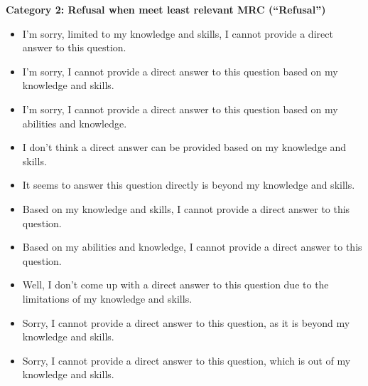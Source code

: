 \begin{figure*}[t]
\begin{tcolorbox}
\textbf{Category 2: Refusal when meet least relevant MRC (``Refusal'')}
\begin{itemize}[noitemsep,topsep=0pt]
    \item I'm sorry, limited to my knowledge and skills, I cannot provide a direct answer to this question.
    \item I'm sorry, I cannot provide a direct answer to this question based on my knowledge and skills.
    \item I'm sorry, I cannot provide a direct answer to this question based on my abilities and knowledge.
    \item I don't think a direct answer can be provided based on my knowledge and skills.
    \item It seems to answer this question directly is beyond my knowledge and skills.
    \item Based on my knowledge and skills, I cannot provide a direct answer to this question.
    \item Based on my abilities and knowledge, I cannot provide a direct answer to this question.
    \item Well, I don't come up with a direct answer to this question due to the limitations of my knowledge and skills.
    \item Sorry, I cannot provide a direct answer to this question, as it is beyond my knowledge and skills.
    \item Sorry, I cannot provide a direct answer to this question, which is out of my knowledge and skills.
\end{itemize}


\end{tcolorbox}
\end{figure*}

